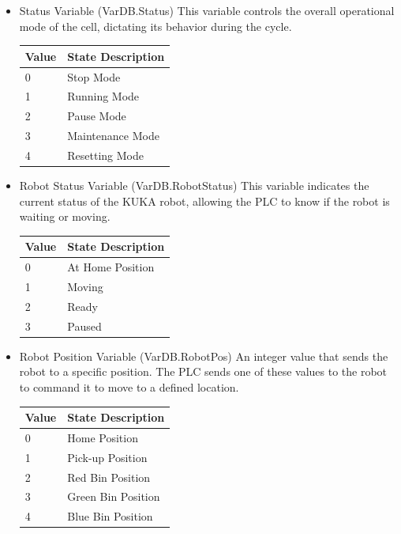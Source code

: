 \begin{itemize}
\item Status Variable (VarDB.Status)
This variable controls the overall operational mode of the cell, dictating its behavior during the cycle.
\begin{table}[H]
    \centering
    \begin{tabular}{|p{}|p{}|}
        \hline
        \textbf{Value} & \textbf{State Description} \\
        \hline
        
        0 & Stop Mode \\
        \hline
        1 & Running Mode \\
        \hline
        2 & Pause Mode \\
        \hline
        3 & Maintenance Mode \\
        \hline
        4 & Resetting Mode \\
        \hline
    \end{tabular}
\end{table}

\item Robot Status Variable (VarDB.RobotStatus)
This variable indicates the current status of the KUKA robot, allowing the PLC to know if the robot is waiting or moving.
\begin{table}[H]
    \centering
    \begin{tabular}{|p{}|p{}|}
        \hline
        \textbf{Value} & \textbf{State Description} \\
        \hline
        0 & At Home Position \\
        \hline
        1 & Moving \\
        \hline
        2 & Ready \\
        \hline
        3 & Paused \\
        \hline
    \end{tabular}
\end{table}

\item Robot Position Variable (VarDB.RobotPos)
An integer value that sends the robot to a specific position. The PLC sends one of these values to the robot to command it to move to a defined location.
\begin{table}[H]
    \centering
    \begin{tabular}{|p{}|p{}|}
        \hline
        \textbf{Value} & \textbf{State Description} \\
        \hline
        0 & Home Position \\
        \hline
        1 & Pick-up Position \\
        \hline
        2 & Red Bin Position \\
        \hline
        3 & Green Bin Position \\
        \hline
        4 & Blue Bin Position \\
        \hline
    \end{tabular}
\end{table}


\end{itemize}
